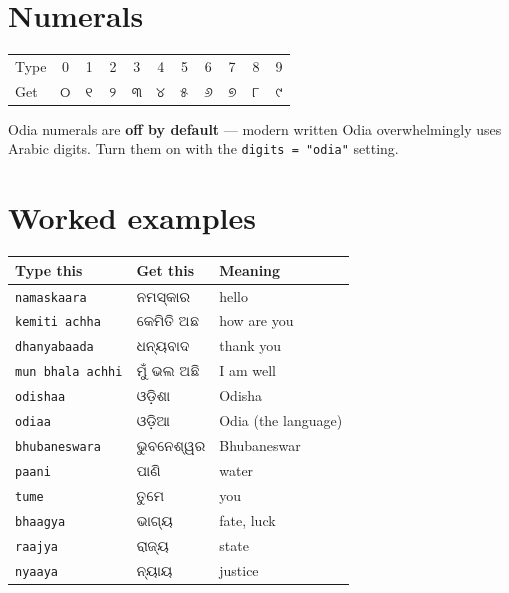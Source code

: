 \documentclass[11pt, a4paper]{article}
\newcommand{\odb}[1]{{\odiafont\large #1}}   %
\begin{document}
\section{Numerals}

\begin{center}
\begin{tabular}{l c c c c c c c c c c}
\toprule
Type   & 0 & 1 & 2 & 3 & 4 & 5 & 6 & 7 & 8 & 9 \\
Get    & \odb{୦} & \odb{୧} & \odb{୨} & \odb{୩} & \odb{୪} & \odb{୫} & \odb{୬} & \odb{୭} & \odb{୮} & \odb{୯} \\
\bottomrule
\end{tabular}
\end{center}

Odia numerals are \textbf{off by default} --- modern written Odia overwhelmingly uses
Arabic digits. Turn them on with the \texttt{digits = "odia"} setting.

\newpage
\section{Worked examples}

\begin{center}
\begin{tabular}{l l l}
\toprule
Type this & Get this & Meaning \\
\midrule
\texttt{namaskaara}   & \odb{ନମସ୍କାର}      & hello \\
\texttt{kemiti achha} & \odb{କେମିତି ଅଛ}     & how are you \\
\texttt{dhanyabaada}  & \odb{ଧନ୍ୟବାଦ}      & thank you \\
\texttt{mun bhala achhi} & \odb{ମୁଁ ଭଲ ଅଛି} & I am well \\
\texttt{odishaa}      & \odb{ଓଡ଼ିଶା}        & Odisha \\
\texttt{odiaa}        & \odb{ଓଡ଼ିଆ}         & Odia (the language) \\
\texttt{bhubaneswara} & \odb{ଭୁବନେଶ୍ୱର}    & Bhubaneswar \\
\texttt{paani}        & \odb{ପାଣି}          & water \\
\texttt{tume}         & \odb{ତୁମେ}          & you \\
\texttt{bhaagya}      & \odb{ଭାଗ୍ୟ}         & fate, luck \\
\texttt{raajya}       & \odb{ରାଜ୍ୟ}         & state \\
\texttt{nyaaya}       & \odb{ନ୍ୟାୟ}         & justice \\
\bottomrule
\end{tabular}
\end{center}
\end{document}
